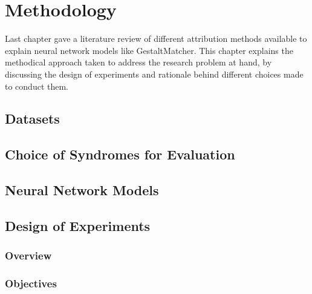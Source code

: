 \documentclass[../report.tex]{subfiles}
\begin{document}
    \chapter{Methodology}
	Last chapter gave a literature review of different attribution methods available to explain neural network models like GestaltMatcher. This chapter explains the methodical approach taken to address the research problem at hand, by discussing the design of experiments and rationale behind different choices made to conduct them. 

    \section{Datasets}
    \section{Choice of Syndromes for Evaluation}
    \section{Neural Network Models}
    \section{Design of Experiments}
    \subsection{Overview}
    \subsection{Objectives}
\end{document}
